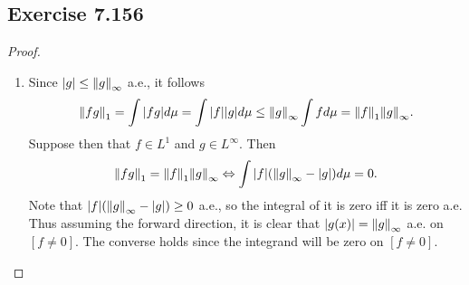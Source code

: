 \documentclass[hw_all.tex]{subfiles}
\begin{document}
\subsection{Exercise 7.156}
\begin{proof}
    \begin{enumerate}
        \item 
            Since $|g| \leq \norm{g}_{\infty}$ a.e., it follows
            \[
                \norm{fg}_1 = \int |fg| d \mu = \int |f| |g| d \mu \leq \norm{g}_{\infty} \int f d \mu = \norm{f}_1 \norm{g}_{\infty}
            .\]
            Suppose then that $f \in L^1$ and $g \in L^\infty$. Then
            \[
                \norm{fg}_1 = \norm{f}_1 \norm{g}_{\infty} \Leftrightarrow \int |f|(\norm{g}_{\infty} - |g|) d \mu = 0
            .\]
            Note that $|f|(\norm{g}_{\infty} - |g|) \geq 0$ a.e., so the integral of it is zero iff it is zero a.e. Thus assuming the forward direction, it is clear that $|g(x)| = \norm{g}_{\infty}$ a.e. on $[f \neq 0]$. The converse holds since the integrand will be zero on $[f \neq 0]$.
    \end{enumerate}
\end{proof}
\end{document}
